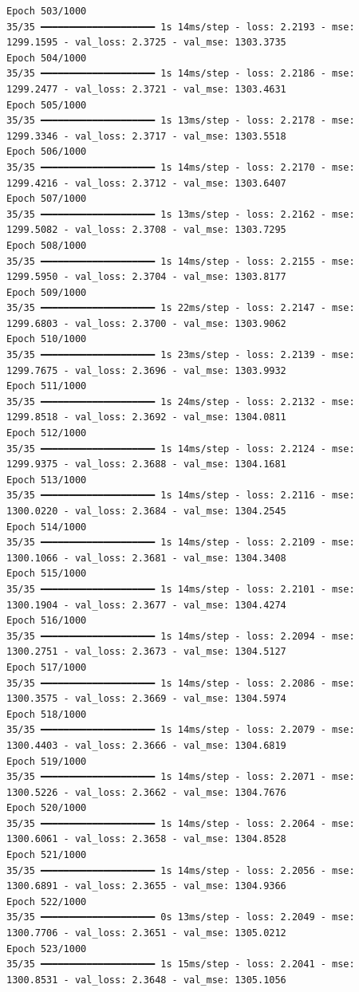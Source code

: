 \documentclass[
  letterpaper,
  DIV=11,
  numbers=noendperiod]{scrreprt}
\begin{document}
\begin{verbatim}
Epoch 503/1000
35/35 ━━━━━━━━━━━━━━━━━━━━ 1s 14ms/step - loss: 2.2193 - mse: 1299.1595 - val_loss: 2.3725 - val_mse: 1303.3735
Epoch 504/1000
35/35 ━━━━━━━━━━━━━━━━━━━━ 1s 14ms/step - loss: 2.2186 - mse: 1299.2477 - val_loss: 2.3721 - val_mse: 1303.4631
Epoch 505/1000
35/35 ━━━━━━━━━━━━━━━━━━━━ 1s 13ms/step - loss: 2.2178 - mse: 1299.3346 - val_loss: 2.3717 - val_mse: 1303.5518
Epoch 506/1000
35/35 ━━━━━━━━━━━━━━━━━━━━ 1s 14ms/step - loss: 2.2170 - mse: 1299.4216 - val_loss: 2.3712 - val_mse: 1303.6407
Epoch 507/1000
35/35 ━━━━━━━━━━━━━━━━━━━━ 1s 13ms/step - loss: 2.2162 - mse: 1299.5082 - val_loss: 2.3708 - val_mse: 1303.7295
Epoch 508/1000
35/35 ━━━━━━━━━━━━━━━━━━━━ 1s 14ms/step - loss: 2.2155 - mse: 1299.5950 - val_loss: 2.3704 - val_mse: 1303.8177
Epoch 509/1000
35/35 ━━━━━━━━━━━━━━━━━━━━ 1s 22ms/step - loss: 2.2147 - mse: 1299.6803 - val_loss: 2.3700 - val_mse: 1303.9062
Epoch 510/1000
35/35 ━━━━━━━━━━━━━━━━━━━━ 1s 23ms/step - loss: 2.2139 - mse: 1299.7675 - val_loss: 2.3696 - val_mse: 1303.9932
Epoch 511/1000
35/35 ━━━━━━━━━━━━━━━━━━━━ 1s 24ms/step - loss: 2.2132 - mse: 1299.8518 - val_loss: 2.3692 - val_mse: 1304.0811
Epoch 512/1000
35/35 ━━━━━━━━━━━━━━━━━━━━ 1s 14ms/step - loss: 2.2124 - mse: 1299.9375 - val_loss: 2.3688 - val_mse: 1304.1681
Epoch 513/1000
35/35 ━━━━━━━━━━━━━━━━━━━━ 1s 14ms/step - loss: 2.2116 - mse: 1300.0220 - val_loss: 2.3684 - val_mse: 1304.2545
Epoch 514/1000
35/35 ━━━━━━━━━━━━━━━━━━━━ 1s 14ms/step - loss: 2.2109 - mse: 1300.1066 - val_loss: 2.3681 - val_mse: 1304.3408
Epoch 515/1000
35/35 ━━━━━━━━━━━━━━━━━━━━ 1s 14ms/step - loss: 2.2101 - mse: 1300.1904 - val_loss: 2.3677 - val_mse: 1304.4274
Epoch 516/1000
35/35 ━━━━━━━━━━━━━━━━━━━━ 1s 14ms/step - loss: 2.2094 - mse: 1300.2751 - val_loss: 2.3673 - val_mse: 1304.5127
Epoch 517/1000
35/35 ━━━━━━━━━━━━━━━━━━━━ 1s 14ms/step - loss: 2.2086 - mse: 1300.3575 - val_loss: 2.3669 - val_mse: 1304.5974
Epoch 518/1000
35/35 ━━━━━━━━━━━━━━━━━━━━ 1s 14ms/step - loss: 2.2079 - mse: 1300.4403 - val_loss: 2.3666 - val_mse: 1304.6819
Epoch 519/1000
35/35 ━━━━━━━━━━━━━━━━━━━━ 1s 14ms/step - loss: 2.2071 - mse: 1300.5226 - val_loss: 2.3662 - val_mse: 1304.7676
Epoch 520/1000
35/35 ━━━━━━━━━━━━━━━━━━━━ 1s 14ms/step - loss: 2.2064 - mse: 1300.6061 - val_loss: 2.3658 - val_mse: 1304.8528
Epoch 521/1000
35/35 ━━━━━━━━━━━━━━━━━━━━ 1s 14ms/step - loss: 2.2056 - mse: 1300.6891 - val_loss: 2.3655 - val_mse: 1304.9366
Epoch 522/1000
35/35 ━━━━━━━━━━━━━━━━━━━━ 0s 13ms/step - loss: 2.2049 - mse: 1300.7706 - val_loss: 2.3651 - val_mse: 1305.0212
Epoch 523/1000
35/35 ━━━━━━━━━━━━━━━━━━━━ 1s 15ms/step - loss: 2.2041 - mse: 1300.8531 - val_loss: 2.3648 - val_mse: 1305.1056

\end{verbatim}
\end{document}
